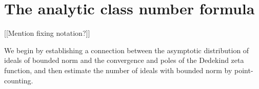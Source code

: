 \documentclass[11pt]{report}
\begin{document}



\chapter{The analytic class number formula}
[[Mention fixing notation?]]

We begin by establishing a connection between the asymptotic distribution of ideals of bounded norm and the convergence and poles of the Dedekind zeta function, and then estimate the number of ideals with bounded norm by point-counting.
\end{document}
